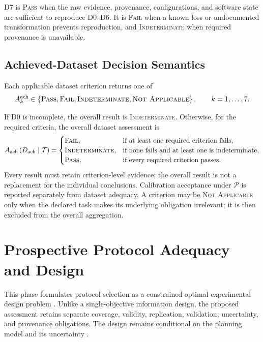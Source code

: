 \documentclass[11pt,a4paper]{article}
\begin{document}
D7 is \textsc{Pass} when the raw evidence, provenance, configurations, and
software state are sufficient to reproduce D0--D6. It is \textsc{Fail} when a
known loss or undocumented transformation prevents reproduction, and
\textsc{Indeterminate} when required provenance is unavailable.

\subsection{Achieved-Dataset Decision Semantics}

Each applicable dataset criterion returns one of
\begin{equation}
    A_k^{\mathrm{ach}}
    \in
    \left\{
        \textsc{Pass},
        \textsc{Fail},
        \textsc{Indeterminate},
        \textsc{Not Applicable}
    \right\},
    \qquad
    k=1,\ldots,7.
\end{equation}

If D0 is incomplete, the overall result is \textsc{Indeterminate}. Otherwise,
for the required criteria, the overall dataset assessment is
\begin{equation}
    A_{\mathrm{ach}}
    \left(
        D_{\mathrm{ach}}
        \mid
        \mathcal{T}
    \right)
    =
    \begin{cases}
        \textsc{Fail},
            & \text{if at least one required criterion fails},\\
        \textsc{Indeterminate},
            & \text{if none fails and at least one is indeterminate},\\
        \textsc{Pass},
            & \text{if every required criterion passes}.
    \end{cases}
\end{equation}
Every result must retain criterion-level evidence; the overall result is not a
replacement for the individual conclusions. Calibration acceptance under
$\mathcal{P}$ is reported separately from dataset adequacy. A criterion may be
\textsc{Not Applicable} only when the declared task makes its underlying
obligation irrelevant; it is then excluded from the overall aggregation.




\section{Prospective Protocol Adequacy and Design}

This phase formulates protocol selection as a constrained optimal experimental
design problem \cite{manchester2010,wilson2014,martensen2024}. Unlike a
single-objective information design, the proposed assessment retains separate
coverage, validity, replication, validation, uncertainty, and provenance
obligations. The design remains conditional on the planning model and its
uncertainty \cite{hu2017}.
\end{document}
